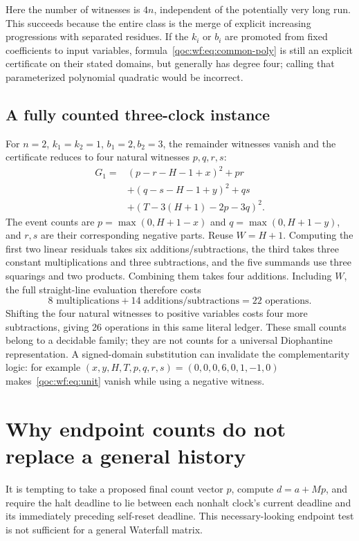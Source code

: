 \documentclass[11pt,letterpaper]{article}
\theoremstyle{definition}
\theoremstyle{remark}
\begin{document}
Here the number of witnesses is $4n$, independent of the potentially very long run. This succeeds because the entire class is the merge of explicit increasing progressions with separated residues. If the $k_i$ or $b_i$ are promoted from fixed coefficients to input variables, formula~\eqref{qoc:wf:eq:common-poly} is still an explicit certificate on their stated domains, but generally has degree four; calling that parameterized polynomial quadratic would be incorrect.

\subsection{A fully counted three-clock instance}
For $n=2$, $k_1=k_2=1$, $b_1=2,b_2=3$, the remainder witnesses vanish and the certificate reduces to four natural witnesses $p,q,r,s$:
\begin{equation}\label{qoc:wf:eq:unit}
 \begin{split}
 G_1={}&(p-r-H-1+x)^2+pr\\
      &+(q-s-H-1+y)^2+qs\\
      &+(T-3(H+1)-2p-3q)^2.
 \end{split}
\end{equation}
The event counts are $p=\max(0,H+1-x)$ and $q=\max(0,H+1-y)$, and $r,s$ are their corresponding negative parts. Reuse $W=H+1$. Computing the first two linear residuals takes six additions/subtractions, the third takes three constant multiplications and three subtractions, and the five summands use three squarings and two products. Combining them takes four additions. Including $W$, the full straight-line evaluation therefore costs
\[
 8\text{ multiplications}+14\text{ additions/subtractions}=22\text{ operations}.
\]
Shifting the four natural witnesses to positive variables costs four more subtractions, giving 26 operations in this same literal ledger. These small counts belong to a decidable family; they are not counts for a universal Diophantine representation. A signed-domain substitution can invalidate the complementarity logic: for example $(x,y,H,T,p,q,r,s)=(0,0,0,6,0,1,-1,0)$ makes~\eqref{qoc:wf:eq:unit} vanish while using a negative witness.

\section{Why endpoint counts do not replace a general history}\label{qoc:wf:sec:obstruction}
It is tempting to take a proposed final count vector $p$, compute $d=a+Mp$, and require the halt deadline to lie between each nonhalt clock's current deadline and its immediately preceding self-reset deadline. This necessary-looking endpoint test is not sufficient for a general Waterfall matrix.
\end{document}
